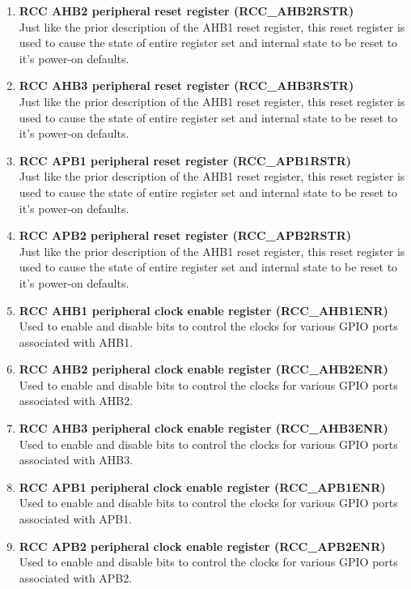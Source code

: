 \documentclass[12pt]{article}
\begin{document}
\begin{enumerate}
    \item\textbf{RCC AHB2 peripheral reset register (RCC\_AHB2RSTR)}
    \\ Just like the prior description of the AHB1 reset register, this reset register is used to cause the state of entire register set and internal state to be reset to it's power-on defaults.
    \item\textbf{RCC AHB3 peripheral reset register (RCC\_AHB3RSTR)}    
    \\ Just like the prior description of the AHB1 reset register, this reset register is used to cause the state of entire register set and internal state to be reset to it's power-on defaults.
    \item\textbf{RCC APB1 peripheral reset register (RCC\_APB1RSTR)}
    \\ Just like the prior description of the AHB1 reset register, this reset register is used to cause the state of entire register set and internal state to be reset to it's power-on defaults.
    \item\textbf{RCC APB2 peripheral reset register (RCC\_APB2RSTR)}
    \\ Just like the prior description of the AHB1 reset register, this reset register is used to cause the state of entire register set and internal state to be reset to it's power-on defaults.
    \item \textbf{RCC AHB1 peripheral clock enable register (RCC\_AHB1ENR) }
    \\ Used to enable and disable bits to control the clocks for various GPIO ports associated with AHB1.
    \item \textbf{RCC AHB2 peripheral clock enable register (RCC\_AHB2ENR) }
    \\ Used to enable and disable bits to control the clocks for various GPIO ports associated with AHB2.
    \item \textbf{RCC AHB3 peripheral clock enable register (RCC\_AHB3ENR) }
    \\ Used to enable and disable bits to control the clocks for various GPIO ports associated with AHB3.
    \item \textbf{RCC APB1 peripheral clock enable register (RCC\_APB1ENR) }
    \\ Used to enable and disable bits to control the clocks for various GPIO ports associated with APB1.
    \item \textbf{RCC APB2 peripheral clock enable register (RCC\_APB2ENR) }
    \\ Used to enable and disable bits to control the clocks for various GPIO ports associated with APB2.

\end{enumerate}
\end{document}
